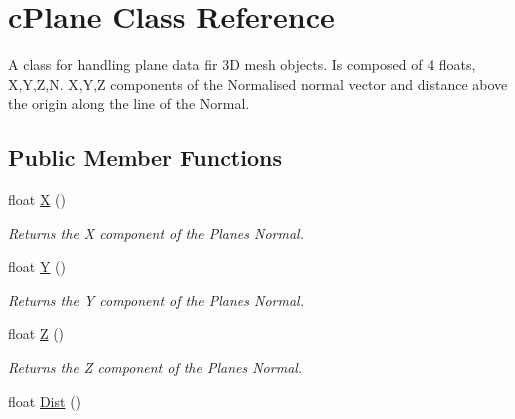 \hypertarget{classc_plane}{
\section{cPlane Class Reference}
\label{classc_plane}
}


A class for handling plane data fir 3D mesh objects. Is composed of 4 floats, X,Y,Z,N. X,Y,Z components of the Normalised normal vector and distance above the origin along the line of the Normal.  


\subsection*{Public Member Functions}
\begin{DoxyCompactItemize}
\item 
\hypertarget{classc_plane_a0d4a4743e3c41a97e2b5362291acf7f1}{
float \hyperlink{classc_plane_a0d4a4743e3c41a97e2b5362291acf7f1}{X} ()}
\label{classc_plane_a0d4a4743e3c41a97e2b5362291acf7f1}

\begin{DoxyCompactList}\small\item\em Returns the X component of the Planes Normal. \end{DoxyCompactList}\item 
\hypertarget{classc_plane_a02c37b8c5e26034bf8112c0a67297449}{
float \hyperlink{classc_plane_a02c37b8c5e26034bf8112c0a67297449}{Y} ()}
\label{classc_plane_a02c37b8c5e26034bf8112c0a67297449}

\begin{DoxyCompactList}\small\item\em Returns the Y component of the Planes Normal. \end{DoxyCompactList}\item 
\hypertarget{classc_plane_a25cc6fd781fa6d55abe248221f0b78f8}{
float \hyperlink{classc_plane_a25cc6fd781fa6d55abe248221f0b78f8}{Z} ()}
\label{classc_plane_a25cc6fd781fa6d55abe248221f0b78f8}

\begin{DoxyCompactList}\small\item\em Returns the Z component of the Planes Normal. \end{DoxyCompactList}\item 
\hypertarget{classc_plane_a1135839bb472839f1ad4d3ed54b8d905}{
float \hyperlink{classc_plane_a1135839bb472839f1ad4d3ed54b8d905}{Dist} ()}
\label{classc_plane_a1135839bb472839f1ad4d3ed54b8d905}


\end{DoxyCompactItemize}

